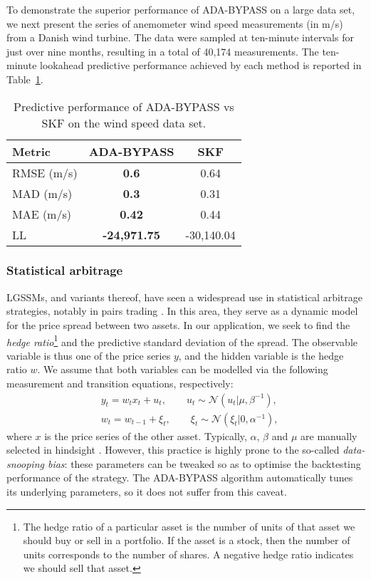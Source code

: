 To demonstrate the superior performance of ADA-BYPASS on a large data set, we next present the series of anemometer wind speed measurements (in m/s) from a Danish wind turbine. The data were sampled at ten-minute intervals for just over nine months, resulting in a total of 40,174 measurements. The ten-minute lookahead predictive performance achieved by each method is reported in Table~\ref{tab:windspeed}.
\begin{table}[t]
\caption{Predictive performance of ADA-BYPASS vs SKF on the wind speed data set.}
\label{tab:windspeed}
\centering
  \begin{tabular}{lcc}
    \toprule
    Metric    & ADA-BYPASS     & SKF \\
    \midrule
    RMSE (m/s) & \textbf{0.6}  & 0.64     \\
    MAD (m/s)     & \textbf{0.3} & 0.31      \\
    MAE (m/s)     & \textbf{0.42}       & 0.44  \\
    LL     & \textbf{-24,971.75}       & -30,140.04  \\
    \bottomrule
  \end{tabular}
\end{table}

\subsubsection{Statistical arbitrage}

LGSSMs, and variants thereof, have seen a widespread use in statistical arbitrage strategies, notably in pairs trading \citep{epchan, triantafyllopoulos11, montana09}. In this area, they serve as a dynamic model for the price spread between two assets. In our application, we seek to find the \emph{hedge ratio}\footnote{The hedge ratio of a particular asset is the number of units of that asset we should buy or sell in a portfolio. If the asset is a stock, then the number of units corresponds to the number of shares. A negative hedge ratio indicates we should sell that asset.} and the predictive standard deviation of the spread. The observable variable is thus one of the price series $y$, and the hidden variable is the hedge ratio $w$. We assume that both variables can be modelled via the following measurement and transition equations, respectively:
\begin{align}
	& y_t = w_t x_t + u_t, \qquad u_t \sim \mathcal{N}(u_t | \mu, \beta^{-1}),
	\\
	& w_t = w_{t-1} + \xi_t, \qquad \xi_t \sim \mathcal{N}(\xi_t | 0, \alpha^{-1}),
\end{align}
where $x$ is the price series of the other asset. Typically, $\alpha$, $\beta$ and $\mu$ are manually selected in hindsight \citep{epchan}. However, this practice is highly prone to the so-called \emph{data-snooping bias}: these parameters can be tweaked so as to optimise the backtesting performance of the strategy. The ADA-BYPASS algorithm automatically tunes its underlying parameters, so it does not suffer from this caveat.

